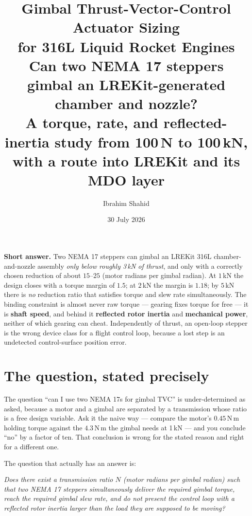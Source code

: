 \documentclass[11pt]{article}
\title{\vspace{-1.2cm}\textbf{\color{accentdark}Gimbal Thrust-Vector-Control Actuator Sizing\\
for 316L Liquid Rocket Engines}\\[0.3em]
\large\normalfont Can two NEMA 17 steppers gimbal an LREKit-generated
chamber and nozzle?\\ A torque, rate, and reflected-inertia study from
100\,N to 100\,kN, with a route into LREKit and its MDO layer}
\author{Ibrahim Shahid}
\date{30 July 2026}
\begin{document}
\maketitle
\thispagestyle{fancy}

\begin{okbox}
\textbf{Short answer.} Two NEMA 17 steppers can gimbal an LREKit
316L chamber-and-nozzle assembly \emph{only below roughly 3\,kN of thrust},
and only with a correctly chosen reduction of about $15$--$25$ (motor radians
per gimbal radian). At $1$\,kN the design closes with a torque margin of
$1.5$; at $2$\,kN the margin is $1.18$; by $5$\,kN there is \emph{no}
reduction ratio that satisfies torque and slew rate simultaneously.
The binding constraint is almost never raw torque --- gearing fixes torque
for free --- it is \textbf{shaft speed}, and behind it \textbf{reflected
rotor inertia} and \textbf{mechanical power}, neither of which gearing can
cheat. Independently of thrust, an open-loop stepper is the wrong device
class for a flight control loop, because a lost step is an undetected
control-surface position error.
\end{okbox}

\tableofcontents
\vspace{0.5em}

\section{The question, stated precisely}

The question ``can I use two NEMA 17s for gimbal TVC'' is under-determined
as asked, because a motor and a gimbal are separated by a transmission whose
ratio is a free design variable. Ask it the naive way --- compare the motor's
$0.45$\,N\,m holding torque against the $4.3$\,N\,m the gimbal needs at
1\,kN --- and you conclude ``no'' by a factor of ten. That conclusion is
wrong for the stated reason and right for a different one.

The question that actually has an answer is:

\begin{keybox}
\emph{Does there exist a transmission ratio $N$ (motor radians per gimbal
radian) such that two NEMA 17 steppers simultaneously deliver the required
gimbal torque, reach the required gimbal slew rate, and do not present the
control loop with a reflected rotor inertia larger than the load they are
supposed to be moving?}
\end{keybox}
\end{document}

